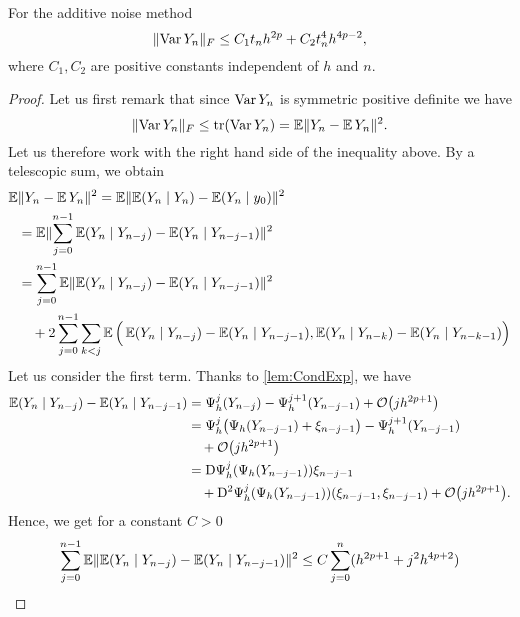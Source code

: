 \documentclass[10pt]{article}
\begin{document}
\begin{theorem} For the additive noise method
	\begin{equation}
		\lVert\operatorname{Var} Y_n\rVert_F \leq C_1 t_n h^{2p} + C_2 t_n^4 h^{4p-2},
	\end{equation}
	where $C_1, C_2$ are positive constants independent of $h$ and $n$.
\end{theorem}
\begin{proof} Let us first remark that since $\operatorname{Var} Y_n$ is symmetric positive definite we have
	\begin{equation}
		\lVert\operatorname{Var} Y_n\rVert_F \leq \operatorname{tr}(\operatorname{Var} Y_n) = \operatorname{\mathbb{E}} \lVert Y_n - \operatorname{\mathbb{E}} Y_n\rVert^2. 
	\end{equation}
	Let us therefore work with the right hand side of the inequality above. By a telescopic sum, we obtain
	\begin{equation}
	\begin{aligned} 
		\operatorname{\mathbb{E}} &\lVert Y_n - \operatorname{\mathbb{E}} Y_n\rVert^2 = \operatorname{\mathbb{E}}\lVert\operatorname{\mathbb{E}} (Y_n \mid Y_n) - \operatorname{\mathbb{E}} (Y_n \mid y_0)\rVert^2\\
		&= \operatorname{\mathbb{E}} \lVert\sum_{j=0}^{n-1} \operatorname{\mathbb{E}}(Y_n \mid Y_{n-j}) - \operatorname{\mathbb{E}}(Y_n \mid Y_{n-j-1}) \rVert^2 \\
		&= \sum_{j=0}^{n-1} \operatorname{\mathbb{E}}\lVert\operatorname{\mathbb{E}}(Y_n \mid Y_{n-j}) - \operatorname{\mathbb{E}}(Y_n \mid Y_{n-j-1})\rVert^2 \\
		&\quad + 2 \sum_{j=0}^{n-1} \sum_{k<j} \operatorname{\mathbb{E}} \Big(\operatorname{\mathbb{E}}(Y_n \mid Y_{n-j}) - \operatorname{\mathbb{E}}(Y_n \mid Y_{n-j-1}), \operatorname{\mathbb{E}}(Y_n \mid Y_{n-k}) - \operatorname{\mathbb{E}}(Y_n \mid Y_{n-k-1})\Big)
	\end{aligned}
	\end{equation}
	Let us consider the first term. Thanks to \cref{lem:CondExp}, we have
	\begin{equation}\label{eq:Increments}
	\begin{aligned}
		\operatorname{\mathbb{E}}(Y_n \mid Y_{n-j}) - \operatorname{\mathbb{E}}(Y_n \mid Y_{n-j-1}) &= \Psi_h^j(Y_{n-j}) - \Psi_h^{j+1}(Y_{n-j-1}) + \mathcal{O}\big(jh^{2p+1}\big)\\
		&= \Psi_h^j\big(\Psi_h(Y_{n-j-1}) + \xi_{n-j-1}\big) - \Psi_h^{j+1}(Y_{n-j-1}) \\
		&\quad + \mathcal{O}\big(jh^{2p+1}\big)\\
		&= \mathrm{D} \Psi_h^j(\Psi_h(Y_{n-j-1}))\xi_{n-j-1} \\
		&\quad + \mathrm{D}^2 \Psi_h^j(\Psi_h(Y_{n-j-1}))(\xi_{n-j-1}, \xi_{n-j-1}) + \mathcal{O}\big(jh^{2p+1}\big).
	\end{aligned}
	\end{equation}
	Hence, we get for a constant $C > 0$
	\begin{equation}
	\begin{aligned}
		\sum_{j=0}^{n-1} \E \norm{\E(Y_n \mid Y_{n-j}) - \E(Y_n \mid Y_{n-j-1})}^2 &\leq  C \sum_{j=0}^n (h^{2p+1} + j^2 h^{4p+2}) \\

\end{aligned}
\end{equation}
\end{proof}
\end{document}
